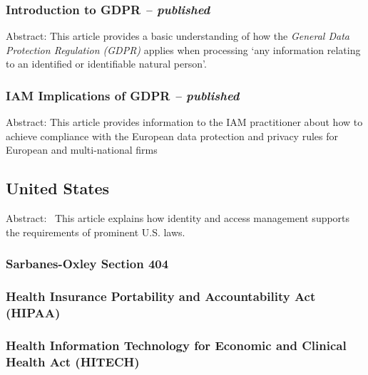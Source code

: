 \hypertarget{introduction-to-gdpr-published}{%
\subsubsection{\texorpdfstring{Introduction to GDPR \emph{--
published}}{Introduction to GDPR -- published}}\label{introduction-to-gdpr-published}}

Abstract: This article provides a basic understanding of how the
\emph{General Data Protection Regulation (GDPR)} applies when processing
`any information relating to an identified or identifiable natural
person'.

\hypertarget{iam-implications-of-gdpr-published}{%
\subsubsection{\texorpdfstring{IAM Implications of GDPR \emph{--
published}}{IAM Implications of GDPR -- published}}\label{iam-implications-of-gdpr-published}}

Abstract: This article provides information to the IAM practitioner
about how to achieve compliance with the European data protection and
privacy rules for European and multi-national firms

\hypertarget{united-states}{%
\subsection{United States}\label{united-states}}

Abstract:~ This article explains how identity and access management
supports the requirements of prominent U.S. laws.

\hypertarget{sarbanes-oxley-section-404}{%
\subsubsection{Sarbanes-Oxley Section
404}\label{sarbanes-oxley-section-404}}

\hypertarget{health-insurance-portability-and-accountability-act-hipaa}{%
\subsubsection{Health Insurance Portability and Accountability Act
(HIPAA)}\label{health-insurance-portability-and-accountability-act-hipaa}}

\hypertarget{health-information-technology-for-economic-and-clinical-health-act-hitech}{%
\subsubsection{Health Information Technology for Economic and Clinical
Health Act
(HITECH)}\label{health-information-technology-for-economic-and-clinical-health-act-hitech}}

